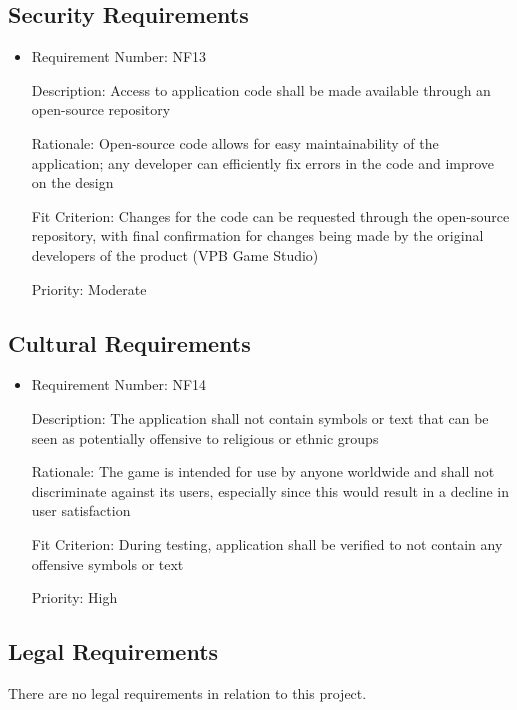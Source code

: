 \documentclass[12pt, titlepage]{article}
\begin{document}
\subsection{Security Requirements}
\begin{itemize}
	\item
	Requirement Number: NF13

	Description: Access to application code shall be made available through an open-source repository

	Rationale: Open-source code allows for easy maintainability of the application; any developer can efficiently fix errors in the code and improve on the design

	Fit Criterion: Changes for the code can be requested through the open-source repository, with final confirmation for changes being made by the original developers of the product (VPB Game Studio)

	Priority: Moderate
\end{itemize}

\subsection{Cultural Requirements}
\begin{itemize}
	\item
	Requirement Number: NF14

	Description: The application shall not contain symbols or text that can be seen as potentially offensive to religious or ethnic groups

	Rationale: The game is intended for use by anyone worldwide and shall not discriminate against its users, especially since this would result in a decline in user satisfaction

	Fit Criterion: During testing, application shall be verified to not contain any offensive symbols or text

	Priority: High
\end{itemize}

\subsection{Legal Requirements}
There are no legal requirements in relation to this project.
\end{document}

